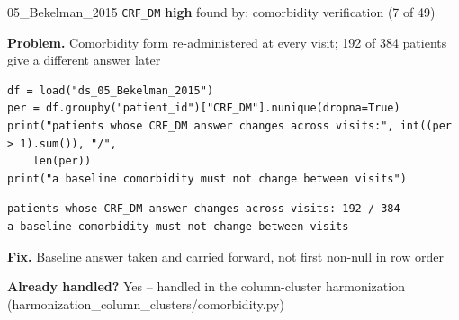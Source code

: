 \documentclass[9pt, t, handout]{beamer}
\newcommand{\ans}[1]{\textcolor{structure.fg}{#1}}
\begin{document}
\begin{frame}[fragile]{05\_Bekelman\_2015 \quad \texttt{CRF\_DM}}
  {\scriptsize\textcolor{orange!80!black}{\textbf{high}} \quad
   found by: comorbidity verification \quad (7 of 49)}
  \vspace{3pt}

  {\footnotesize \textbf{Problem.} Comorbidity form re-administered at every visit; 192 of 384 patients give a different answer later}
  \vspace{4pt}

  \begin{Verbatim}[fontsize=\tiny, frame=single, framesep=2pt, label=\tiny reproduce]
df = load("ds_05_Bekelman_2015")
per = df.groupby("patient_id")["CRF_DM"].nunique(dropna=True)
print("patients whose CRF_DM answer changes across visits:", int((per > 1).sum()), "/", 
    len(per))
print("a baseline comorbidity must not change between visits")
  \end{Verbatim}
  \begin{Verbatim}[fontsize=\tiny, frame=single, framesep=2pt, label=\tiny output]
patients whose CRF_DM answer changes across visits: 192 / 384
a baseline comorbidity must not change between visits
  \end{Verbatim}
  \vspace{2pt}

  {\footnotesize \textbf{Fix.} Baseline answer taken and carried forward, not first non-null in row order}
  \vspace{2pt}

  {\footnotesize \textbf{Already handled?} \ans{Yes} -- handled in the column-cluster harmonization
   (harmonization\_column\_clusters/comorbidity.py)}
\end{frame}
\end{document}

